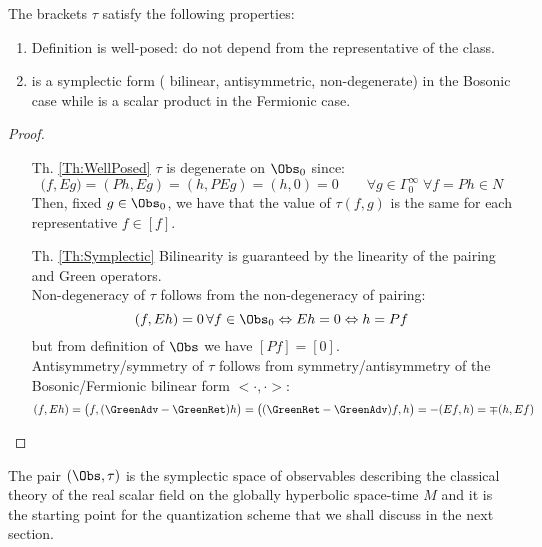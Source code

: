 \documentclass[Main]{subfiles}
\begin{document}
				\begin{proposition}
				The brackets  $\tau$ satisfy the following properties:
					\begin{enumerate}
						\item\label{Th:WellPosed} Definition is well-posed: do not depend from the representative of the class.
						\item\label{Th:Symplectic} is a symplectic form ( bilinear, antisymmetric, non-degenerate) in the Bosonic case while is a scalar product in	the Fermionic case.
					\end{enumerate}
				\end{proposition}
				\begin{proof}
					\begin{itemize}
						\item [Th. \ref{Th:WellPosed}]
							 $\tau$ is degenerate on $\Obs_0$ since:
							 \begin{displaymath}
							 	\big( f , E g \big) = (P h , E g) = (h, PE g) = (h,0) = 0 \qquad \forall g \in \Gamma_0^\infty \; \forall f=Ph \in N
							 \end{displaymath}
							 Then, fixed $g\in \Obs_0$, we have that the value of $\tau(f,g)$ is the same for each representative $f\in[f]$.

						\item [Th. \ref{Th:Symplectic}]	
							Bilinearity is guaranteed by the linearity of the pairing and Green operators.\\
							Non-degeneracy of $\tau$ follows from the non-degeneracy of pairing:
							\begin{displaymath}
								(f, E h) = 0 \, \forall f \in \Obs_0 \Leftrightarrow E h = 0 \Leftrightarrow h = P f
							\end{displaymath}
							but from definition of $\Obs$ we have $[Pf] = [0]$.\\
							Antisymmetry/symmetry of $\tau $ follows from symmetry/antisymmetry of the Bosonic/Fermionic bilinear form $< \cdot, \cdot>$:
							\begin{displaymath}
								( f , E h ) =\big(f, (\GreenAdv - \GreenRet ) h \big)= \big( ( \GreenRet - \GreenAdv) f , h \big) =- ( Ef , h) = \mp(h, Ef)
							\end{displaymath}							 
					\end{itemize}
				\end{proof}
				The pair $(\Obs,\tau)$ is the symplectic space of observables describing the classical theory of the real scalar field on the globally hyperbolic space-time $M$ and it is the starting point for the quantization scheme that we shall discuss in the next section.
\end{document}
